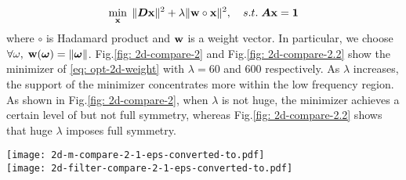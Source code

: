 \begin{align}
\min_{\mathbf{x}}\; \Vert\boldsymbol{ D}\mathbf{x}\Vert^2 + \lambda\Vert \mathbf{w}\circ\mathbf{x}\Vert^2,\quad s.t. \; \boldsymbol{A}\mathbf{x} = \mathbf{1} \label{eq: opt-2d-weight}
\end{align} 
where $\circ$ is Hadamard product and $\mathbf{w}$ is a weight vector. In particular, we choose $\forall \omega, \; \mathbf{w}(\boldsymbol{\omega}) = \Vert\boldsymbol{\omega}\Vert$. Fig.\ref{fig: 2d-compare-2} and Fig.\ref{fig: 2d-compare-2.2} show the minimizer of \eqref{eq: opt-2d-weight} with $\lambda=60$ and $600$ respectively. As $\lambda$ increases, the support of the minimizer concentrates more within the low frequency region. As shown in Fig.\ref{fig: 2d-compare-2}, when $\lambda$ is not huge, the minimizer achieves a certain level of but not full symmetry, whereas Fig.\ref{fig: 2d-compare-2.2} shows that huge $\lambda$ imposes full symmetry.

\begin{minipage}{.9\textwidth}
\centering
\texttt{[image: 2d-m-compare-2-1-eps-converted-to.pdf]}\\
\texttt{[image: 2d-filter-compare-2-1-eps-converted-to.pdf]}
\label{fig: 2d-compare-2}
\end{minipage}

